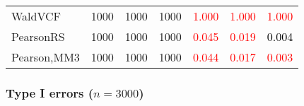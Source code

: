 \documentclass[
]{article}
\begin{document}
\begin{table}[H]
{\begin{tabular}[t]{lrrrrrr}
\hspace{1em}WaldVCF & 1000 & 1000 & 1000 & \textcolor{red}{1.000} & \textcolor{red}{1.000} & \textcolor{red}{1.000}\\
\hspace{1em}PearsonRS & 1000 & 1000 & 1000 & \textcolor{red}{0.045} & \textcolor{red}{0.019} & \textcolor{black}{0.004}\\
\hspace{1em}Pearson,MM3 & 1000 & 1000 & 1000 & \textcolor{red}{0.044} & \textcolor{red}{0.017} & \textcolor{red}{0.003}\\
\bottomrule
\end{tabular}}
\endgroup{}
\end{table}

\hypertarget{type-i-errors-n3000-2}{%
\subsubsection{\texorpdfstring{Type I errors
(\(n=3000\))}{Type I errors (n=3000)}}\label{type-i-errors-n3000-2}}
\end{document}
